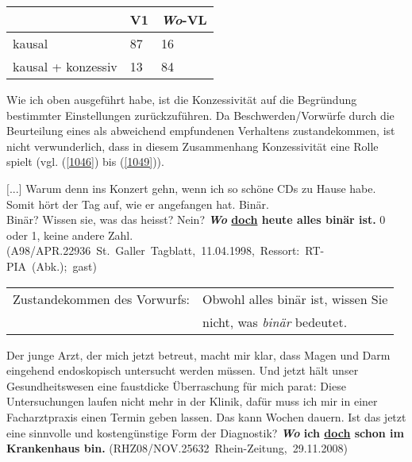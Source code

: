 {\begin{exe}
	\ex\label{1045} 
    \begin{tabular}[t]{|l|l|l|}
    \hline
	& V1 & \textit{Wo}-VL\\
	\hline
	kausal & 87 & 16\\
	\hline
	kausal + konzessiv & 13 & 84\\
	\hline
    \end{tabular}   
\end{exe}
Wie ich oben ausgeführt habe, ist die Konzessivität auf die Begründung be\-stimmter Einstellungen zurückzuführen. Da Beschwerden/Vorwürfe durch die Beurteilung eines als abweichend empfundenen Verhaltens zustandekommen, ist nicht verwunderlich, dass in diesem Zusammenhang Konzessivität eine Rolle spielt (vgl. (\ref{1046}) bis (\ref{1049})).

\begin{exe}
	\ex\label{1046} 
	\scriptsize
	$[$...$]$ Warum denn ins Konzert gehn, wenn ich so schöne CDs zu Hause habe. Somit hört der Tag auf, wie er angefangen hat. Binär.\\
	Binär? Wissen sie, was das heisst? Nein? \textbf{\textit{Wo} \underline{doch} heute alles binär ist.} 0 oder 1, keine andere Zahl.
	\newline              		
	\hbox{}\hfill\hbox {(A98/APR.22936 St. Galler Tagblatt, 11.04.1998, Ressort: RT-PIA (Abk.); gast)}
\end{exe}
			                     
\begin{exe}
	\ex\label{1047} 
	\begin{tabular}[t]{ll}
	Zustandekommen des Vorwurfs: & Obwohl alles binär ist, wissen Sie \\
	& nicht, was \textit{binär} bedeutet.
	\end{tabular}
\end{exe}
	
\begin{exe}
	\ex\label{1048} 
	\scriptsize
	Der junge Arzt, der mich jetzt betreut, macht mir klar, dass Magen und Darm eingehend endoskopisch untersucht werden müssen. Und jetzt hält unser 			Gesundheitswesen eine faustdicke Überraschung für mich parat: Diese Untersuchungen laufen nicht mehr in der Klinik, dafür muss ich mir in einer 			Facharztpraxis einen Termin geben lassen. Das kann Wochen dauern. Ist das jetzt eine sinnvolle und kostengünstige Form der Diagnostik? 						\textbf{\textit{Wo} ich \underline{doch} schon im Krankenhaus bin.}
	\newline              		
	\hbox{}\hfill\hbox {(RHZ08/NOV.25632 Rhein-Zeitung, 29.11.2008)}
\end{exe}	

}
